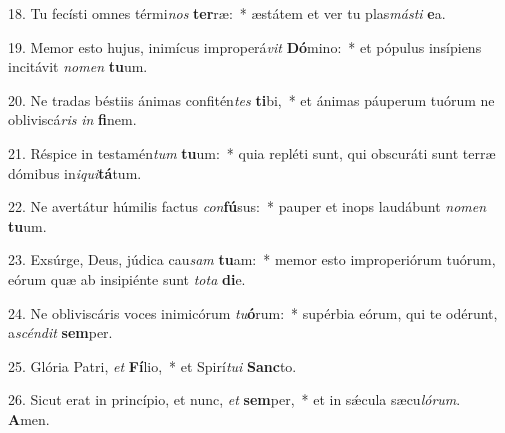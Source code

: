 18. Tu fecísti omnes térmi\textit{nos} \textbf{ter}ræ:~*  æstátem et ver tu plas\textit{más}\textit{ti} \textbf{e}a.\

19. Memor esto hujus, inimícus improperá\textit{vit} \textbf{Dó}mino:~*  et pópulus insípiens incitávit \textit{no}\textit{men} \textbf{tu}um.\

20. Ne tradas béstiis ánimas confitén\textit{tes} \textbf{ti}bi,~*  et ánimas páuperum tuórum ne obliviscá\textit{ris} \textit{in} \textbf{fi}nem.\

21. Réspice in testamén\textit{tum} \textbf{tu}um:~*  quia repléti sunt, qui obscuráti sunt terræ dómibus in\textit{i}\textit{qui}\textbf{tá}tum.\

22. Ne avertátur húmilis factus \textit{con}\textbf{fú}sus:~*  pauper et inops laudábunt \textit{no}\textit{men} \textbf{tu}um.\

23. Exsúrge, Deus, júdica cau\textit{sam} \textbf{tu}am:~*  memor esto improperiórum tuórum, eórum quæ ab insipiénte sunt \textit{to}\textit{ta} \textbf{di}e.\

24. Ne obliviscáris voces inimicórum \textit{tu}\textbf{ó}rum:~*  supérbia eórum, qui te odérunt, a\textit{scén}\textit{dit} \textbf{sem}per.\

25. Glória Patri, \textit{et} \textbf{Fí}lio,~*  et Spirí\textit{tu}\textit{i} \textbf{Sanc}to.\

26. Sicut erat in princípio, et nunc, \textit{et} \textbf{sem}per,~*  et in sǽcula sæcu\textit{ló}\textit{rum}. \textbf{A}men.\

